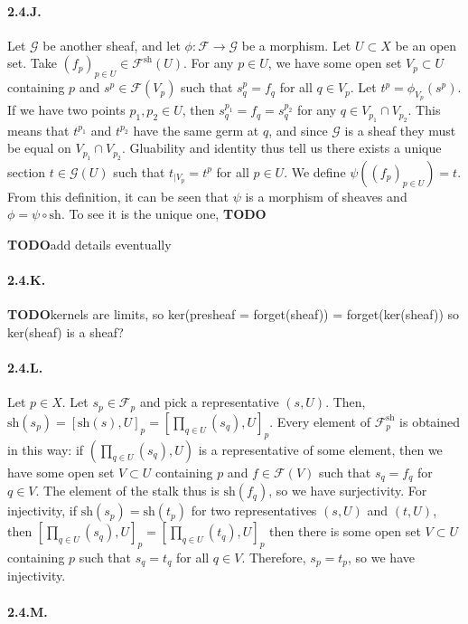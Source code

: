 \documentclass{article}
\newcommand{\sh}{\mathrm{sh}}
\newcommand{\todo}{\textbf{TODO}}
\newcommand{\Fsheaf}{\mathscr{F}}
\newcommand{\Gsheaf}{\mathscr{G}}
\begin{document}
\paragraph{2.4.J.} Let $\Gsheaf$ be another sheaf, and let $\phi : \Fsheaf \to \Gsheaf$ be a morphism. Let $U \subset X$ be an open set. Take $(f_p)_{p \in U} \in \Fsheaf^\sh (U)$. For any $p \in U$, we have some open set $V_p \subset U$ containing $p$ and $s^p \in \Fsheaf(V_p)$ such that $s_q^p = f_q$ for all $q \in V_p$. Let $t^p = \phi_{V_p} (s^p)$. If we have two points $p_1,p_2 \in U$, then $s^{p_1}_q = f_q = s^{p_2}_q$ for any $q \in V_{p_1} \cap V_{p_2}$. This means that $t^{p_1}$ and $t^{p_2}$ have the same germ at $q$, and since $\Gsheaf$ is a sheaf they must be equal on $V_{p_1} \cap V_{p_2}$. Gluability and identity thus tell us there exists a unique section $t \in \Gsheaf(U)$ such that $t_{\mid V_p} = t^p$ for all $p \in U$. We define $\psi((f_p)_{p \in U}) = t$. From this definition, it can be seen that $\psi$ is a morphism of sheaves and $\phi = \psi \circ \sh$. To see it is the unique one, \todo

\todo add details eventually

\paragraph{2.4.K.} \todo kernels are limits, so ker(presheaf = forget(sheaf)) = forget(ker(sheaf)) so ker(sheaf) is a sheaf?

\paragraph{2.4.L.} Let $p \in X$. Let $s_p \in \Fsheaf_p$ and pick a representative $(s,U)$. Then, $\sh(s_p) = [\sh(s),U]_p = [\prod_{q \in U} (s_q),U]_p$. Every element of $\Fsheaf^\sh_p$ is obtained in this way: if $(\prod_{q \in U} (s_q),U)$ is a representative of some element, then we have some open set $V \subset U$ containing $p$ and $f \in \Fsheaf(V)$ such that $s_q = f_q$ for $q \in V$. The element of the stalk thus is $\sh(f_q)$, so we have surjectivity. For injectivity, if $\sh(s_p) = \sh(t_p)$ for two representatives $(s,U)$ and $(t,U)$, then $[\prod_{q \in U} (s_q),U]_p = [\prod_{q \in U} (t_q),U]_p$ then there is some open set $V \subset U$ containing $p$ such that $s_q = t_q$ for all $q \in V$. Therefore, $s_p = t_p$, so we have injectivity.

\paragraph{2.4.M.} 
\end{document}
